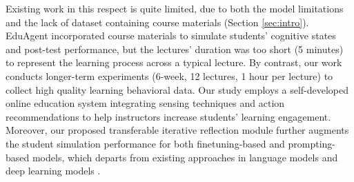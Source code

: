 Existing work in this respect is quite limited, due to both the model limitations and the lack of dataset containing course materials (Section \ref{sec:intro}). 
EduAgent \cite{xu2024eduagent} incorporated course materials to simulate students' cognitive states and post-test performance, but the lectures' duration was too short (5 minutes) to represent the learning process across a typical lecture. By contrast, our work conducts longer-term experiments (6-week, 12 lectures, 1 hour per lecture) to collect high quality learning behavioral data. Our study employs a self-developed online education system integrating sensing techniques and action recommendations to help instructors increase students' learning engagement. Moreover, our proposed transferable iterative reflection module further augments the student simulation performance for both finetuning-based and prompting-based models, which departs from existing approaches in language models \cite{li2024integrating,lee2024monacobert,lee2024language} and deep learning models \cite{piech2015deepknowledgetracing,zhang2017dynamickeyvaluememorynetworks}.



